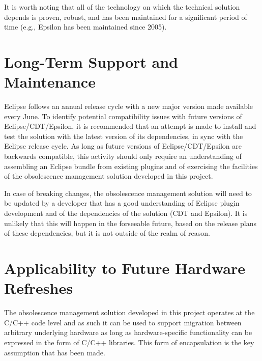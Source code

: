 \documentclass{llncs}
\begin{document}
It is worth noting that all of the technology on which the technical solution depends is proven, robust, and has been maintained for a significant period of time (e.g., Epsilon has been maintained since 2005).
 

\section{Long-Term Support and Maintenance}
Eclipse follows an annual release cycle with a new major version made available every June. To identify potential compatibility issues with future versions of Eclipse/CDT/Epsilon, it is recommended that an attempt is made to install and test the solution with the latest version of its dependencies, in sync with the Eclipse release cycle. As long as future versions of Eclipse/CDT/Epsilon are backwards compatible, this activity should only require an understanding of assembling an Eclipse bundle from existing plugins and of exercising the facilities of the obsolescence management solution developed in this project.

In case of breaking changes, the obsolescence management solution will need to be updated by a developer that has a good understanding of Eclipse plugin development and of the dependencies of the solution (CDT and Epsilon). It is unlikely that this will happen in the forseeable future, based on the release plans of these dependencies, but it is not outside of the realm of reason.

\section{Applicability to Future Hardware Refreshes}
The obsolescence management solution developed in this project operates at the C/C++ code level and as such it can be used to support migration between arbitrary underlying hardware as long as hardware-specific functionality can be expressed in the form of C/C++ libraries. This form of encapsulation is the key assumption that has been made. 




\renewcommand{\baselinestretch}{1.0}
\end{document}
